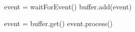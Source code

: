 \documentclass[varwidth=28em,crop]{standalone}
\begin{document}
\begin{minipage}{.42\linewidth}
\vspace{1em}
\begin{pythoncode}
event = waitForEvent()
buffer.add(event)      
\end{pythoncode}
\end{minipage}\qquad
\begin{minipage}{.4\linewidth}
\vspace{1em}
\begin{pythoncode}
event = buffer.get()
event.process()      
\end{pythoncode}
\end{minipage}
\end{document}
